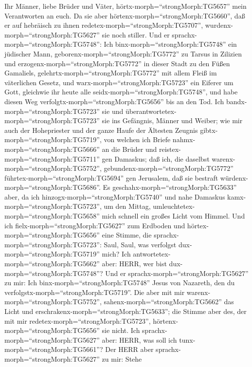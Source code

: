  Ihr Männer, liebe Brüder und Väter,
hörtx-morph=``strongMorph:TG5657'' mein Verantworten an euch.
 Da sie aber hörtenx-morph=``strongMorph:TG5660'', daß er
auf hebräisch zu ihnen redetex-morph=``strongMorph:TG5707'',
wurdenx-morph=``strongMorph:TG5627'' sie noch stiller. Und er
sprachx-morph=``strongMorph:TG5748'':  Ich
binx-morph=``strongMorph:TG5748'' ein jüdischer Mann,
geborenx-morph=``strongMorph:TG5772'' zu Tarsus in Zilizien und
erzogenx-morph=``strongMorph:TG5772'' in dieser Stadt zu den Füßen
Gamaliels, gelehrtx-morph=``strongMorph:TG5772'' mit allem Fleiß im
väterlichen Gesetz, und warx-morph=``strongMorph:TG5723'' ein Eiferer um
Gott, gleichwie ihr heute alle seidx-morph=``strongMorph:TG5748'',
 und habe diesen Weg verfolgtx-morph=``strongMorph:TG5656''
bis an den Tod. Ich bandx-morph=``strongMorph:TG5723'' sie und
überantwortetex-morph=``strongMorph:TG5723'' sie ins Gefängnis, Männer
und Weiber;  wie mir auch der Hohepriester und der ganze
Haufe der Ältesten Zeugnis gibtx-morph=``strongMorph:TG5719'', von
welchen ich Briefe nahmx-morph=``strongMorph:TG5666'' an die Brüder und
reistex-morph=``strongMorph:TG5711'' gen Damaskus; daß ich, die daselbst
warenx-morph=``strongMorph:TG5752'',
gebundenx-morph=``strongMorph:TG5772''
führtex-morph=``strongMorph:TG5694'' gen Jerusalem, daß sie bestraft
würdenx-morph=``strongMorph:TG5686''.  Es
geschahx-morph=``strongMorph:TG5633'' aber, da ich
hinzogx-morph=``strongMorph:TG5740'' und nahe Damaskus
kamx-morph=``strongMorph:TG5723'', um den Mittag,
umleuchtetex-morph=``strongMorph:TG5658'' mich schnell ein großes Licht
vom Himmel.  Und ich fielx-morph=``strongMorph:TG5627'' zum
Erdboden und hörtex-morph=``strongMorph:TG5656'' eine Stimme, die
sprachx-morph=``strongMorph:TG5723'': Saul, Saul, was verfolgst
dux-morph=``strongMorph:TG5719'' mich?  Ich
antwortetex-morph=``strongMorph:TG5662'' aber: HERR, wer bist
dux-morph=``strongMorph:TG5748''? Und er
sprachx-morph=``strongMorph:TG5627'' zu mir: Ich
binx-morph=``strongMorph:TG5748'' Jesus von Nazareth, den du
verfolgstx-morph=``strongMorph:TG5719''.  Die aber mit mir
warenx-morph=``strongMorph:TG5752'', sahenx-morph=``strongMorph:TG5662''
das Licht und erschrakenx-morph=``strongMorph:TG5633''; die Stimme aber
des, der mit mir redetex-morph=``strongMorph:TG5723'',
hörtenx-morph=``strongMorph:TG5656'' sie nicht.  Ich
sprachx-morph=``strongMorph:TG5627'' aber: HERR, was soll ich
tunx-morph=``strongMorph:TG5661''? Der HERR aber
sprachx-morph=``strongMorph:TG5627'' zu mir: Stehe
